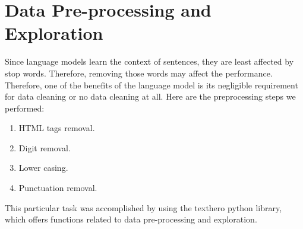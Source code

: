 \documentclass[%
	BCOR=8mm, %
	DIV=12,
	toc=bibliography, %
	toc=listof, %
	oneside, %
	egregdoesnotlikesansseriftitles, %
	]{scrbook}
\begin{document}
\section{Data Pre-processing and Exploration}
\label{section:datapreproc}
Since language models learn the context of sentences, they are least affected by stop words. Therefore, removing those words may affect the performance. Therefore, one of the benefits of the language model is its negligible requirement for data cleaning or no data cleaning at all. Here are the preprocessing steps we performed:
\begin{enumerate}
\item  HTML tags removal.
\item Digit removal.
\item Lower casing.
\item  Punctuation removal.
\end{enumerate}
This particular task was accomplished by using the texthero python library, which offers functions related to data pre-processing and exploration.
\end{document}
